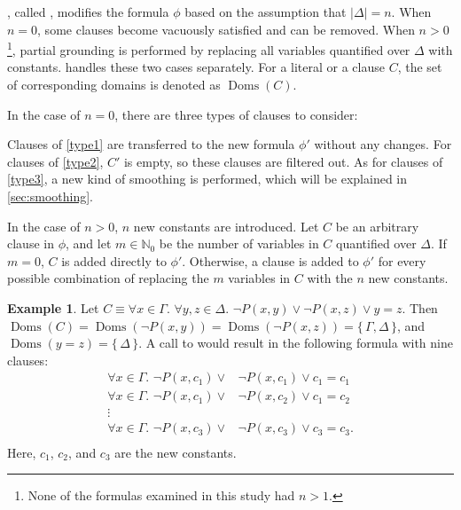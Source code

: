 \documentclass[letterpaper]{article} %
\theoremstyle{remark}
\theoremstyle{definition}
\newtheorem{example}{Example}
\DeclareMathOperator{\Doms}{Doms}
\begin{document}
, called \Propagate, modifies the formula $\phi$ based on
the assumption that $|\Delta| = n$. When $n=0$, some clauses become vacuously
satisfied and can be removed. When $n > 0$\footnote{None of the formulas
  examined in this study had $n > 1$.}, partial grounding is performed by
replacing all variables quantified over $\Delta$ with constants.
 handles these two cases separately. For a literal or a
clause $C$, the set of corresponding domains is denoted as $\Doms(C)$.

In the case of $n = 0$, there are three types of clauses to consider:
Clauses of \cref{type1} are transferred to the new formula $\phi'$ without any
changes. For clauses of \cref{type2}, $C'$ is empty, so these clauses are
filtered out. As for clauses of \cref{type3}, a new kind of smoothing is
performed, which will be explained in \cref{sec:smoothing}.

In the case of $n>0$, $n$ new constants are introduced. Let $C$ be an arbitrary
clause in $\phi$, and let $m \in \mathbb{N}_{0}$ be the number of variables in
$C$ quantified over $\Delta$. If $m=0$, $C$ is added directly to $\phi'$.
Otherwise, a clause is added to $\phi'$ for every possible combination of
replacing the $m$ variables in $C$ with the $n$ new constants.

\begin{example}
  Let $C \equiv \forall x \in \Gamma\text{. }\forall y, z \in \Delta\text{.
  } \neg P(x, y) \lor \neg P(x, z) \lor y=z$. Then
  $\Doms(C) = \Doms(\neg P(x, y)) = \Doms(\neg P(x, z)) = \{\, \Gamma, \Delta \,\}$,
  and $\Doms(y=z) = \{\, \Delta \,\}$. A call to  would result in the following formula with nine clauses:
  \begin{align*}
    \forall x \in \Gamma\text{. }\neg P(x, c_{1}) \lor& \neg P(x, c_{1}) \lor c_{1}=c_{1}\\
    \forall x \in \Gamma\text{. }\neg P(x, c_{1}) \lor& \neg P(x, c_{2}) \lor c_{1}=c_{2}\\
    \vdots&\\
    \forall x \in \Gamma\text{. }\neg P(x, c_{3}) \lor& \neg P(x, c_{3}) \lor c_{3}=c_{3}.\\
  \end{align*}
  Here, $c_{1}$, $c_{2}$, and $c_{3}$ are the new constants.
\end{example}
\end{document}
